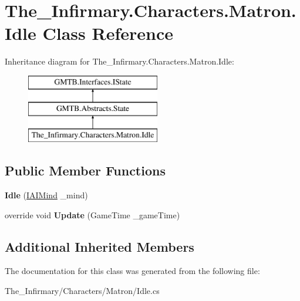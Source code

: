 \hypertarget{class_the___infirmary_1_1_characters_1_1_matron_1_1_idle}{}\section{The\+\_\+\+Infirmary.\+Characters.\+Matron.\+Idle Class Reference}
\label{class_the___infirmary_1_1_characters_1_1_matron_1_1_idle}
Inheritance diagram for The\+\_\+\+Infirmary.\+Characters.\+Matron.\+Idle\+:\begin{figure}[H]
\begin{center}
\leavevmode
\includegraphics[height=3.000000cm]{class_the___infirmary_1_1_characters_1_1_matron_1_1_idle}
\end{center}
\end{figure}
\subsection*{Public Member Functions}
\begin{DoxyCompactItemize}
\item 
\mbox{\label{class_the___infirmary_1_1_characters_1_1_matron_1_1_idle_a5ecfe092321aeb4f9485ad75dea508da}} 
{\bfseries Idle} (\mbox{\hyperlink{interface_g_m_t_b_1_1_interfaces_1_1_i_a_i_mind}{I\+A\+I\+Mind}} \+\_\+mind)
\item 
\mbox{\label{class_the___infirmary_1_1_characters_1_1_matron_1_1_idle_a9ea982575d8f5c820aceaebad5ca2ed9}} 
override void {\bfseries Update} (Game\+Time \+\_\+game\+Time)
\end{DoxyCompactItemize}
\subsection*{Additional Inherited Members}


The documentation for this class was generated from the following file\+:\begin{DoxyCompactItemize}
\item 
The\+\_\+\+Infirmary/\+Characters/\+Matron/Idle.\+cs\end{DoxyCompactItemize}
